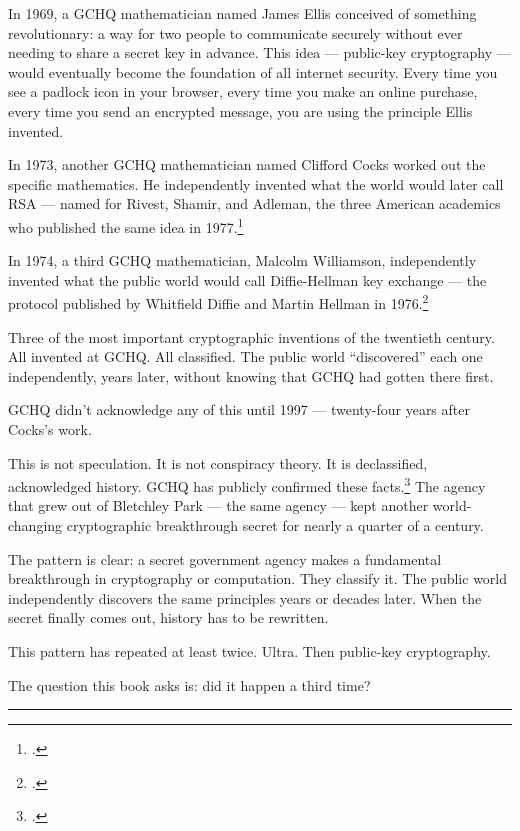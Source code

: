 In 1969, a GCHQ mathematician named James Ellis conceived of something revolutionary: a way for two people to communicate securely without ever needing to share a secret key in advance. This idea --- public-key cryptography --- would eventually become the foundation of all internet security. Every time you see a padlock icon in your browser, every time you make an online purchase, every time you send an encrypted message, you are using the principle Ellis invented.

In 1973, another GCHQ mathematician named Clifford Cocks worked out the specific mathematics. He independently invented what the world would later call RSA --- named for Rivest, Shamir, and Adleman, the three American academics who published the same idea in 1977.\footcite{rsa1977}

In 1974, a third GCHQ mathematician, Malcolm Williamson, independently invented what the public world would call Diffie-Hellman key exchange --- the protocol published by Whitfield Diffie and Martin Hellman in 1976.\footcite{diffiehellman1976}

Three of the most important cryptographic inventions of the twentieth century. All invented at GCHQ\@. All classified. The public world ``discovered'' each one independently, years later, without knowing that GCHQ had gotten there first.

GCHQ didn't acknowledge any of this until 1997 --- twenty-four years after Cocks's work.

This is not speculation. It is not conspiracy theory. It is declassified, acknowledged history. GCHQ has publicly confirmed these facts.\footcite{singh1999} The agency that grew out of Bletchley Park --- the same agency --- kept another world-changing cryptographic breakthrough secret for nearly a quarter of a century.

The pattern is clear: a secret government agency makes a fundamental breakthrough in cryptography or computation. They classify it. The public world independently discovers the same principles years or decades later. When the secret finally comes out, history has to be rewritten.

This pattern has repeated at least twice. Ultra. Then public-key cryptography.

The question this book asks is: did it happen a third time?

\vspace{1cm}\noindent\rule{0.5\textwidth}{0.5pt}\vspace{0.5cm}

